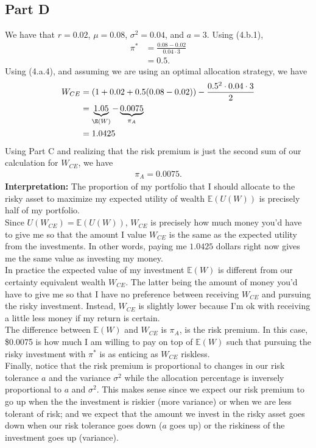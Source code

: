 \documentclass{article}
\begin{document}
\subsection*{Part D}
We have that $r = 0.02$, $\mu = 0.08$, $\sigma^2 = 0.04$, and $a = 3$. Using (4.b.1),
\begin{align*}
	\pi^* &= \frac{0.08 - 0.02}{0.04\cdot 3}\\
	&= 0.5.
\end{align*}
Using (4.a.4), and assuming we are using an optimal allocation strategy, we have
\begin{align*}
	W_{CE} &= (1 + 0.02 + 0.5(0.08 - 0.02)) - \frac{0.5^2\cdot 0.04 \cdot 3}{2}\\
	&= \underbrace{1.05}_{\E(W)} - \underbrace{0.0075}_{\pi_A}\\
	&= 1.0425
\end{align*}
Using Part C and realizing that the risk premium is just the second sum of our calculation for $W_{CE}$, we have
\begin{align*}
	\pi_A = 0.0075.
\end{align*}
\textbf{Interpretation:} The proportion of my portfolio that I should allocate to the risky asset to maximize my expected utility of wealth $\mathbb{E}(U(W))$ is precisely half of my portfolio.\\

 Since $U(W_{CE}) = \mathbb{E}(U(W))$, $W_{CE}$ is precisely how much money you'd have to give me so that the amount I value $W_{CE}$ is the same as the expected utility from the investments. In other words, paying me $1.0425$ dollars right now gives me the same value as investing my money.\\
 
In practice the expected value of my investment $\mathbb{E}(W)$ is different from our certainty equivalent wealth $W_{CE}$. The latter being the amount of money you'd have to give me so that I have no preference between receiving $W_{CE}$ and pursuing the risky investment. Instead, $W_{CE}$ is slightly lower because I'm ok with receiving a little less money if my return is certain.\\

The difference between $\mathbb{E}(W)$ and $W_{CE}$ is $\pi_A$, is the risk premium. In this case, \$0.0075 is how much I am willing to pay on top of $\mathbb{E}(W)$ such that pursuing the risky investment with $\pi^*$ is as enticing as $W_{CE}$ riskless.\\

Finally, notice that the risk premium is proportional to changes in our risk tolerance $a$ and the variance $\sigma^2$ while the allocation percentage is inversely proportional to $a$ and $\sigma^2$. This makes sense since we expect our risk premium to go up when the the investment is riskier (more variance) or when we are less tolerant of risk; and we expect that the amount we invest in the risky asset goes down when our risk tolerance goes down ($a$ goes up) or the riskiness of the investment goes up (variance). 
\end{document}
